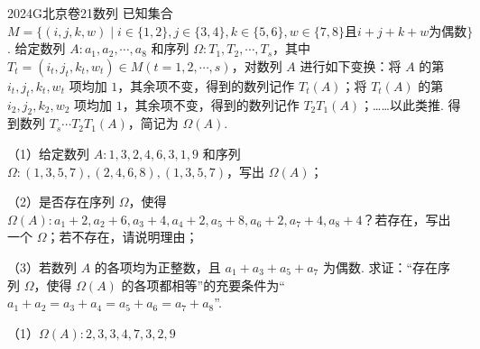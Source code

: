 
\begin{problem}{2024}{G}{北京卷}{21}{数列}
已知集合 $ M=\{(i,j,k,w)\mid i\in\{1,2\},j\in\{3,4\},k\in\{5,6\},w\in\{7,8\} \text{且} i+j+k+w \text{为偶数}\} $. 给定数列 $ A:a_1,a_2,\cdots,a_8 $ 和序列 $ \Omega:T_1,T_2,\cdots,T_s $，其中 $ T_t=(i_t,j_t,k_t,w_t)\in M(t=1,2,\cdots,s) $，对数列 $ A $ 进行如下变换：将 $ A $ 的第 $ i_t,j_t,k_t,w_t $ 项均加 $ 1 $，其余项不变，得到的数列记作 $ T_t(A) $；将 $ T_t(A) $ 的第 $ i_2,j_2,k_2,w_2 $ 项均加 $ 1 $，其余项不变，得到的数列记作 $ T_2T_1(A) $；……以此类推. 得到数列 $ T_s\cdots T_2T_1(A) $，简记为 $ \Omega(A) $.

（1）给定数列 $ A:1,3,2,4,6,3,1,9 $ 和序列 $ \Omega:(1,3,5,7),(2,4,6,8),(1,3,5,7) $，写出 $ \Omega(A) $；

（2）是否存在序列 $ \Omega $，使得 $ \Omega(A):a_1+2,a_2+6,a_3+4,a_4+2,a_5+8,a_6+2,a_7+4,a_8+4 $？若存在，写出一个 $ \Omega $；若不存在，请说明理由；

（3）若数列 $ A $ 的各项均为正整数，且 $ a_1+a_3+a_5+a_7 $ 为偶数. 求证：“存在序列 $ \Omega $，使得 $ \Omega(A) $ 的各项都相等”的充要条件为“$ a_1+a_2=a_3+a_4=a_5+a_6=a_7+a_8 $”.
\end{problem}

\begin{answer}
（1）$ \Omega(A):2,3,3,4,7,3,2,9 $
\end{answer}

